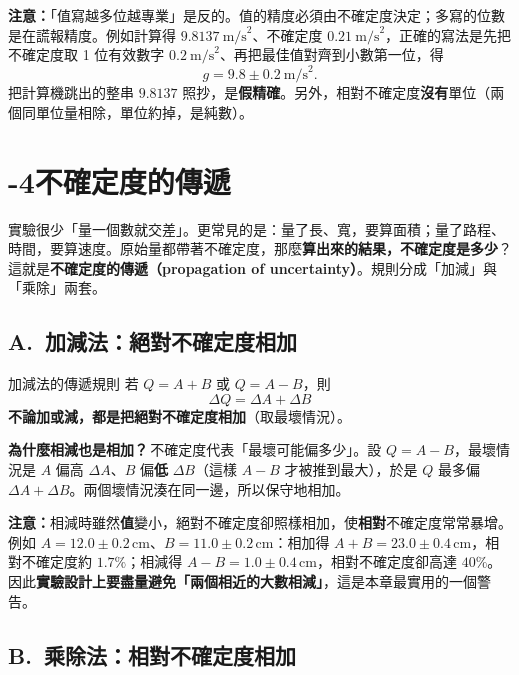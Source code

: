 \documentclass[11pt]{article}
\begin{document}
\textbf{注意：}「值寫越多位越專業」是反的。值的精度必須由不確定度決定；多寫的位數是在謊報精度。例如計算得 $9.8137\ \text{m/s}^2$、不確定度 $0.21\ \text{m/s}^2$，正確的寫法是先把不確定度取 1 位有效數字 $0.2\ \text{m/s}^2$、再把最佳值對齊到小數第一位，得
$$g = 9.8 \pm 0.2\ \text{m/s}^2.$$
把計算機跳出的整串 $9.8137$ 照抄，是\textbf{假精確}。另外，相對不確定度\textbf{沒有}單位（兩個同單位量相除，單位約掉，是純數）。

\section*{-4\quad 不確定度的傳遞}

實驗很少「量一個數就交差」。更常見的是：量了長、寬，要算面積；量了路程、時間，要算速度。原始量都帶著不確定度，那麼\textbf{算出來的結果，不確定度是多少}？這就是\textbf{不確定度的傳遞（propagation of uncertainty）}。規則分成「加減」與「乘除」兩套。


\subsection*{\sffamily A.\ 加減法：絕對不確定度相加}

\begin{補充框}{加減法的傳遞規則}
若 $Q = A + B$ 或 $Q = A - B$，則
$$\boxed{\ \Delta Q = \Delta A + \Delta B\ }$$
\textbf{不論加或減，都是把絕對不確定度相加}（取最壞情況）。

\textbf{為什麼相減也是相加？}\,不確定度代表「最壞可能偏多少」。設 $Q=A-B$，最壞情況是 $A$ 偏高 $\Delta A$、$B$ 偏\textbf{低} $\Delta B$（這樣 $A-B$ 才被推到最大），於是 $Q$ 最多偏 $\Delta A+\Delta B$。兩個壞情況湊在同一邊，所以保守地相加。
\end{補充框}

\textbf{注意：}相減時雖然\textbf{值}變小，絕對不確定度卻照樣相加，使\textbf{相對}不確定度常常暴增。例如 $A = 12.0 \pm 0.2$\,cm、$B = 11.0 \pm 0.2$\,cm：相加得 $A+B = 23.0 \pm 0.4$\,cm，相對不確定度約 $1.7\%$；相減得 $A-B = 1.0 \pm 0.4$\,cm，相對不確定度卻高達 $40\%$。因此\textbf{實驗設計上要盡量避免「兩個相近的大數相減」}，這是本章最實用的一個警告。

\subsection*{\sffamily B.\ 乘除法：相對不確定度相加}
\end{document}
